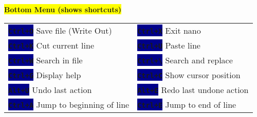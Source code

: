 \documentclass[11pt, a4paper, landscape]{article}
\newcommand{\key}[1]{\colorbox{darkblue}{\color{white}\texttt{\footnotesize\textbf{#1}}}}
\begin{document}
\begin{minipage}[t]{0.48\textwidth}
\begin{tcolorbox}[colback=lightgray!30, colframe=gray!50, title={\textbf{1. Opening Nano}}, fonttitle=\normalsize\bfseries]
\begin{minipage}{\textwidth}
\begin{tcolorbox}[colback=black, colframe=darkgray, boxrule=1pt, arc=2pt, left=0pt, right=0pt, top=0pt, bottom=0pt]
                \vspace{5pt}
                \colorbox{darkgray}{}
            \end{tcolorbox}

            \vspace{1pt}
            \hfill\colorbox{yellow}{\color{black}\footnotesize\textbf{Bottom Menu (shows shortcuts)}}
        \end{minipage}
    \end{tcolorbox}

    \vspace{8pt}

    \begin{tcolorbox}[colback=lightgray!30, colframe=gray!50, title={\textbf{2. Essential Shortcuts}}, fonttitle=\normalsize\bfseries]
        \vspace{-5pt}
        \begin{tabularx}{\textwidth}{@{}X@{\hspace{8pt}}X@{}}
            \key{Ctrl+O} Save file (Write Out) & \key{Ctrl+X} Exit nano \\[2pt]
            \key{Ctrl+K} Cut current line & \key{Ctrl+U} Paste line \\[2pt]
            \key{Ctrl+W} Search in file & \key{Ctrl+\textbackslash} Search and replace \\[2pt]
            \key{Ctrl+G} Display help & \key{Ctrl+C} Show cursor position \\[2pt]
            \key{Alt+U} Undo last action & \key{Alt+E} Redo last undone action \\[2pt]
            \key{Ctrl+A} Jump to beginning of line & \key{Ctrl+E} Jump to end of line
        \end{tabularx}
    \end{tcolorbox}
\end{minipage}
\hfill
\end{document}
